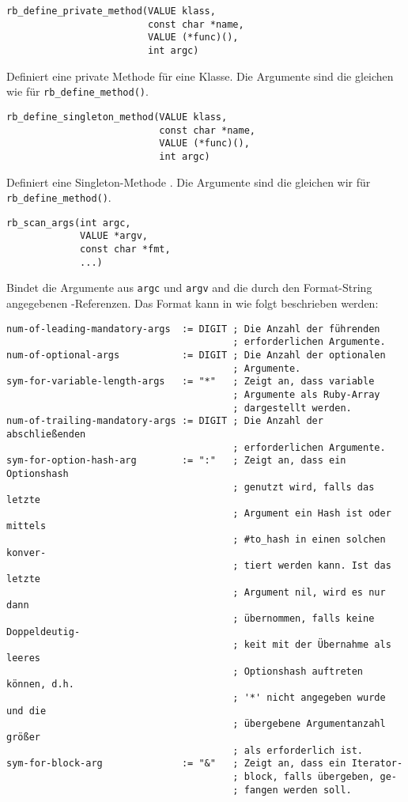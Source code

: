 \begin{lstlisting}
rb_define_private_method(VALUE klass,
                         const char *name,
                         VALUE (*func)(),
                         int argc)
\end{lstlisting}

\noindent Definiert eine private Methode für eine Klasse. Die
Argumente sind die gleichen wie für \verb+rb_define_method()+.

\begin{lstlisting}
rb_define_singleton_method(VALUE klass,
                           const char *name,
                           VALUE (*func)(),
                           int argc)
\end{lstlisting}

\noindent Definiert eine Singleton-Methode
. Die Argumente sind die gleichen wir für
\verb+rb_define_method()+.

\begin{lstlisting}
rb_scan_args(int argc,
             VALUE *argv,
             const char *fmt,
             ...)
\end{lstlisting}

\noindent Bindet die Argumente aus \verb+argc+ und \verb+argv+ and die
durch den Format-String angegebenen \VALUE-Referenzen. Das Format kann
in  wie folgt beschrieben werden:

\begin{verbatim}
num-of-leading-mandatory-args  := DIGIT ; Die Anzahl der führenden
                                        ; erforderlichen Argumente.
num-of-optional-args           := DIGIT ; Die Anzahl der optionalen
                                        ; Argumente.
sym-for-variable-length-args   := "*"   ; Zeigt an, dass variable
                                        ; Argumente als Ruby-Array
                                        ; dargestellt werden.
num-of-trailing-mandatory-args := DIGIT ; Die Anzahl der abschließenden
                                        ; erforderlichen Argumente.
sym-for-option-hash-arg        := ":"   ; Zeigt an, dass ein Optionshash
                                        ; genutzt wird, falls das letzte
                                        ; Argument ein Hash ist oder mittels
                                        ; #to_hash in einen solchen konver-
                                        ; tiert werden kann. Ist das letzte
                                        ; Argument nil, wird es nur dann
                                        ; übernommen, falls keine Doppeldeutig-
                                        ; keit mit der Übernahme als leeres
                                        ; Optionshash auftreten können, d.h.
                                        ; '*' nicht angegeben wurde und die
                                        ; übergebene Argumentanzahl größer
                                        ; als erforderlich ist.
sym-for-block-arg              := "&"   ; Zeigt an, dass ein Iterator-
                                        ; block, falls übergeben, ge-
                                        ; fangen werden soll.
\end{verbatim}

